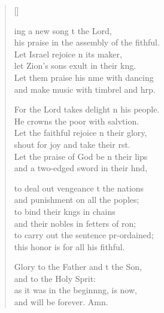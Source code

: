\settowidth{\versewidth}{his praise in the assembly of the faithful.}
\begin{verse}[\versewidth]
  \begin{patverse}
    ing a new song t the Lord,\Med\\
his praise in the assembly of the fithful.\\
Let Israel rejoice \pointup{\i}n its maker,\Med\\
let Zion’s sons exult in their k\pointup{\i}ng.\\
Let them praise his nme with dancing\Med\\
and make music with timbrel and hrp.

For the Lord takes delight \pointup{\i}n his people.\Med\\
He crowns the poor with salvtion.\\
Let the faithful rejoice \pointup{\i}n their glory,\Med\\
shout for joy and take their rst.\\
Let the praise of God be n their lips\Med\\
and a two-edged sword in their hnd,

to deal out vengeance t the nations\Med\\
and punishment on all the poples;\\
to bind their k\pointup{\i}ngs in chains\Med\\
and their nobles in fetters of \pointup{\i}ron;\\
to carry out the sentence pr-ordained;\Med\\
this honor is for all his fithful.

Glory to the Father and t the Son,\Med\\
and to the Holy Sp\pointup{\i}rit:\\
as it was in the beginn\pointup{\i}ng, is now,\Med\\
and will be forever. Amn.
  \end{patverse}
\end{verse}
